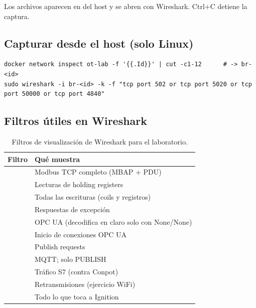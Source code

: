 Los archivos aparecen en  del host y se abren con Wireshark. Ctrl+C detiene la captura.

\subsection{Capturar desde el host (solo Linux)}

\begin{lstlisting}[style=bash]
docker network inspect ot-lab -f '{{.Id}}' | cut -c1-12      # -> br-<id>
sudo wireshark -i br-<id> -k -f "tcp port 502 or tcp port 5020 or tcp port 50000 or tcp port 4840"
\end{lstlisting}

\subsection{Filtros útiles en Wireshark}

\begin{table}[H]
\centering\small
\caption{Filtros de visualización de Wireshark para el laboratorio.}
\label{tab:filtros}
\begin{tabularx}{\textwidth}{L{5.6cm} X}
\toprule
\textbf{Filtro} & \textbf{Qué muestra} \\
\midrule
{} & Modbus TCP completo (MBAP + PDU) \\
 & Lecturas de holding registers \\
 & Todas las escrituras (coils y registros) \\
 & Respuestas de excepción \\
 & OPC UA (decodifica en claro solo con None/None) \\
 & Inicio de conexiones OPC UA \\
 & Publish requests \\
 & MQTT;  solo PUBLISH \\
 & Tráfico S7 (contra Conpot) \\
 & Retransmisiones (ejercicio WiFi) \\
 & Todo lo que toca a Ignition \\
\bottomrule
\end{tabularx}
\end{table}


